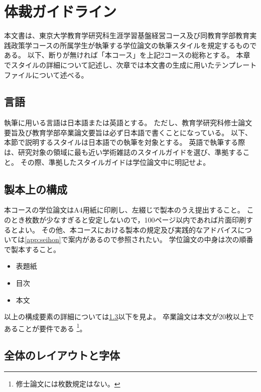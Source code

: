 
\chapter{体裁ガイドライン}
	\label{chp:guideline}

	本文書は、東京大学教育学研究科生涯学習基盤経営コース及び同教育学部教育実践政策学コースの所属学生が執筆する学位論文の執筆スタイルを規定するものである。
	以下、断りが無ければ「本コース」を上記2コースの総称とする。
	本章でスタイルの詳細について記述し、次章では本文書の生成に用いたテンプレートファイルについて述べる。

	\section{言語}
		\label{sub:language}

		執筆に用いる言語は日本語または英語とする。
		ただし、教育学研究科修士論文要旨及び教育学部卒業論文要旨は必ず日本語で書くことになっている。
		以下、本節で説明するスタイルは日本語での執筆を対象とする。
		英語で執筆する際は、研究対象の領域に最も近い学術雑誌のスタイルガイドを選び、準拠すること。
		その際、準拠したスタイルガイドは学位論文中に明記せよ。

	\section{製本上の構成}
		\label{sub:seihon}

		本コースの学位論文はA4用紙に印刷し、左綴じで製本のうえ提出すること。
		このとき枚数が少なすぎると安定しないので，100ページ以内であれば片面印刷するとよい。
		その他、本コースにおける製本の規定及び実践的なアドバイスについては\cref{app:seihon}で案内があるので参照されたい。
		学位論文の中身は次の順番で製本すること。

	\begin{itemize}
		\item 表題紙
		\item 目次
		\item 本文
	\end{itemize}

	以上の構成要素の詳細については\cref{sec:layout}以下を見よ。
	卒業論文は本文が20枚以上であることが要件である
	\footnote{修士論文には枚数規定はない。}。

	\section{全体のレイアウトと字体}
		\label{sec:layout}

